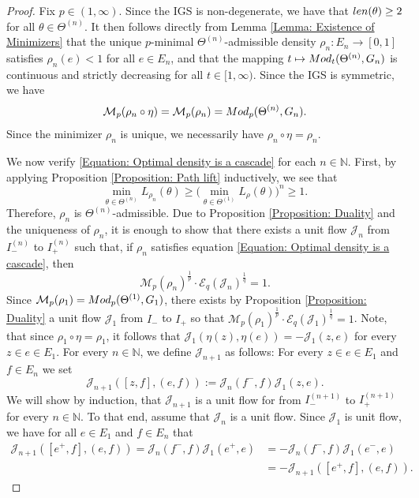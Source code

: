 \documentclass[10pt,a4paper]{amsart}
\newcommand{\Mod}{{\rm Mod}}
\newcommand{\N}{\mathbb{N}}
\newcommand{\cE}{\mathcal{E}}
\newcommand{\cJ}{\mathcal{J}}
\newcommand{\cM}{\mathcal{M}}
\newcommand{\len}{{\rm len}}
\begin{document}
\begin{proof}
    
    Fix \(p\in(1,\infty)\). Since the IGS is non-degenerate, we have that \(\len(\theta)\geq 2\) for all \(\theta\in\Theta^{(n)}\). It then follows directly from Lemma \ref{Lemma: Existence of Minimizers} that the unique \(p\)-minimal \(\Theta^{(n)}\)-admissible density \(\rho_n\colon E_n\to[0,1]\) satisfies \(\rho_n(e)<1\) for all \(e\in E_n\), and that the mapping \(t\mapsto\Mod_t(\Theta^{(n)},G_n)\) is continuous and strictly decreasing for all \(t\in[1,\infty)\). Since the IGS is symmetric, we have
        \[
            \cM_p(\rho_n\circ \eta)=\cM_p(\rho_n)=\Mod_p(\Theta^{(n)},G_n).
        \]
    Since the minimizer $\rho_n$ is unique, we necessarily have \(\rho_n\circ \eta=\rho_n\). 
    
    We now verify \eqref{Equation: Optimal density is a cascade} for each \(n\in\N\). First, by applying Proposition \ref{Proposition: Path lift} inductively, we see that
        \[
            \min_{\theta\in\Theta^{(n)}}L_{\rho_n}(\theta)\geq\big(\min_{\theta\in\Theta^{(1)}}L_{\rho}(\theta)\big)^n\geq1.
        \]
    Therefore, \(\rho_n\) is \(\Theta^{(n)}\)-admissible. Due to Proposition \ref{Proposition: Duality} and the uniqueness of \(\rho_n\), it is enough to show that there exists a unit flow \(\cJ_n\) from \(I^{(n)}_-\) to \(I^{(n)}_+\) such that, if \(\rho_n\) satisfies equation \eqref{Equation: Optimal density is a cascade}, then 
        \[
            \cM_p(\rho_n)^\frac{1}{p}\cdot \cE_q(\cJ_n)^\frac{1}{q}=1.
        \]
    Since \(\cM_p(\rho_1)=\Mod_p(\Theta^{(1)},G_1)\), there exists by Proposition \ref{Proposition: Duality} a unit flow \(\cJ_1\) from \(I_-\) to \(I_+\) so that \(\cM_p(\rho_1)^\frac{1}{p}\cdot\cE_q(\cJ_1)^\frac{1}{q}=1\). Note, that since \(\rho_1\circ \eta = \rho_1\), it follows that \(\cJ_1(\eta(z),\eta(e))=-\cJ_1(z,e)\) for every \(z\in e\in E_1\). For every \(n\in\N\), we define \(\cJ_{n+1}\) as follows: For every \(z\in e\in E_1\) and \(f\in E_n\) we set
        \[
            \cJ_{n+1}([z,f],(e,f)):=\cJ_{n}(f^-,f)\cJ_1(z,e).
        \]
    We will show by induction, that \(\cJ_{n+1}\) is a unit flow for from \(I_-^{(n+1)}\) to \(I_+^{(n+1)}\) for every \(n\in \N\). To that end, assume that \(\cJ_n\) is a unit flow. Since \(\cJ_1\) is unit flow, we have for all \(e\in E_1\) and \(f\in E_n\) that
        \[
        \begin{split}
            \cJ_{n+1}([e^+,f],(e,f))=\cJ_{n}(f^-,f)\cJ_1(e^+,e)
            &=-\cJ_{n}(f^-,f)\cJ_1(e^-,e)\\&=-\cJ_{n+1}([e^+,f],(e,f)).

\end{split}\]
\end{proof}
\end{document}
